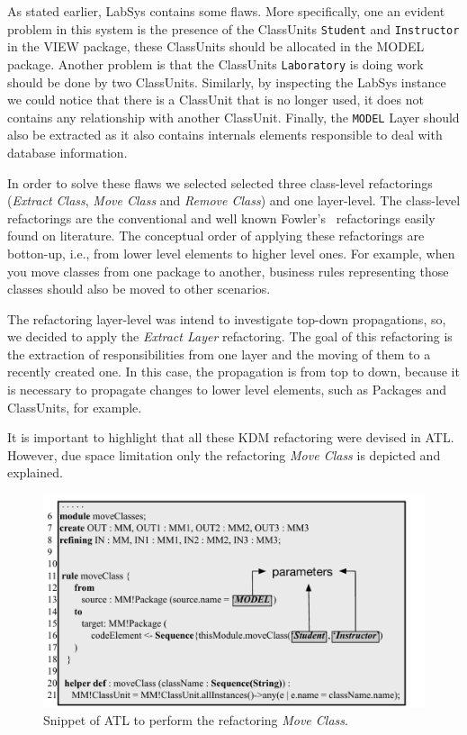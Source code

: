 As stated earlier, LabSys contains some flaws. More specifically, one an evident problem in this system is the presence of the ClassUnits \texttt{Student} and \texttt{Instructor} in the VIEW package, these ClassUnits should be allocated in the MODEL package. Another problem is that the ClassUnits \texttt{Laboratory} is doing work should be done by two ClassUnits. Similarly, by inspecting the LabSys instance we could notice that there is a ClassUnit that is no longer used, it does not contains any relationship with another ClassUnit. Finally, the \texttt{MODEL} Layer should also be extracted as it also contains internals elements responsible to deal with database information. 

In order to solve these flaws we selected selected three class-level refactorings (\textit{Extract Class}, \textit{Move Class} and \textit{Remove Class}) and one layer-level. The class-level refactorings are the conventional and well known Fowler's~\cite{refactImpro} refactorings easily found on literature. The conceptual order of applying these refactorings are botton-up, i.e., from lower level elements to higher level ones. For example, when you move classes from one package to another, business rules representing those classes should also be moved to other scenarios.

The refactoring  layer-level was intend to investigate top-down propagations, so, we decided to apply the \textit{Extract Layer} refactoring. The goal of this refactoring is the extraction of responsibilities from one layer and the moving of them to a recently created one. In this case, the propagation is from top to down, because it is necessary to propagate changes to lower level elements, such as Packages and ClassUnits, for example. 

It is important to highlight that all these KDM refactoring were devised in ATL. However, due space limitation only the refactoring \textit{Move Class} is depicted and explained.

\begin{figure}[h]
	\centering
	\includegraphics[scale=0.516]{figuras/NovoMoveClassFormatted}
	\caption{Snippet of ATL to perform the refactoring \textit{Move Class}.}
	\label{fig:ATLRefactoring}
\end{figure}

